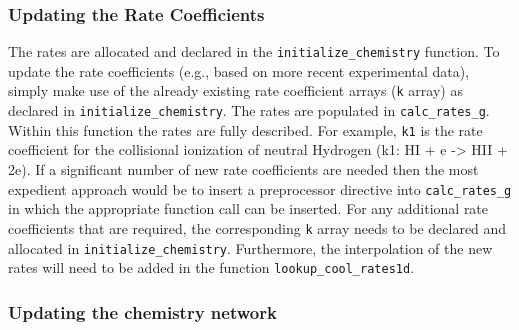 
\subsubsection{Updating the Rate Coefficients}

The rates are allocated and declared in the
\texttt{initialize\_chemistry} function. To update the rate
coefficients (e.g., based on more recent experimental data), simply
make use of the already existing rate coefficient arrays (\texttt{k}
array) as declared in \texttt{initialize\_chemistry}. The rates are
populated in \texttt{calc\_rates\_g}. Within this function the rates
are fully described. For example, \texttt{k1} is the rate coefficient
for the collisional ionization of neutral Hydrogen (k1: HI + e -> HII
+ 2e). If a significant number of new rate coefficients are needed
then the most expedient approach would be to insert a preprocessor
directive into \texttt{calc\_rates\_g} in which the appropriate
function call can be inserted.  For any additional rate coefficients
that are required, the corresponding \texttt{k} array needs to be
declared and allocated in \texttt{initialize\_chemistry}.
Furthermore, the interpolation of the new rates will need to be added
in the function \texttt{lookup\_cool\_rates1d}.


\subsubsection{Updating the chemistry network}


